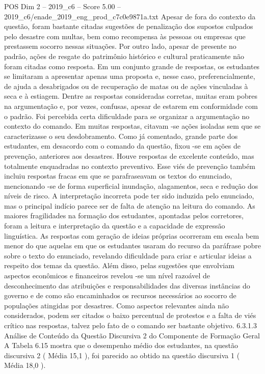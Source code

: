 \begin{textsample}{POS Dim 2 – 2019\_c6 – Score 5.00 – 2019\_c6/enade\_2019\_eng\_prod\_c7c0e9871a.txt}
Apesar de fora do contexto da questão, foram bastante citadas sugestões de penalização dos supostos culpados pelo desastre com multas, bem como recompensa às pessoas ou empresas que prestassem socorro nessas situações.
Por outro lado, apesar de presente no padrão, ações de resgate do patrimônio histórico e cultural praticamente não foram citadas como resposta.
Em um conjunto grande de respostas, os estudantes se limitaram a apresentar apenas uma proposta e, nesse caso, preferencialmente, de ajuda a desabrigados ou de recuperação de matas ou de ações vinculadas à seca e à estiagem.
Dentre as respostas consideradas corretas, muitas eram pobres na argumentação e, por vezes, confusas, apesar de estarem em conformidade com o padrão.
Foi percebida certa dificuldade para se organizar a argumentação no contexto do comando.
Em muitas respostas, citavam -se ações isoladas sem que se caracterizasse o seu desdobramento.
Como já comentado, grande parte dos estudantes, em desacordo com o comando da questão, fixou -se em ações de prevenção, anteriores aos desastres.
Houve respostas de excelente conteúdo, mas totalmente enquadradas no contexto preventivo.
Esse viés de prevenção também incluiu respostas fracas em que se parafraseavam os textos do enunciado, mencionando -se de forma superficial inundação, alagamentos, seca e redução dos níveis de risco.
A interpretação incorreta pode ter sido induzida pelo enunciado, mas o principal indício parece ser de falta de atenção na leitura do comando.
As maiores fragilidades na formação dos estudantes, apontadas pelos corretores, foram a leitura e interpretação da questão e a capacidade de expressão linguística.
As respostas com geração de ideias próprias ocorreram em escala bem menor do que aquelas em que os estudantes usaram do recurso da paráfrase pobre sobre o texto do enunciado, revelando dificuldade para criar e articular ideias a respeito dos temas da questão.
Além disso, pelas sugestões que envolviam aspectos econômicos e financeiros revelou -se um nível razoável de desconhecimento das atribuições e responsabilidades das diversas instâncias do governo e de como são encaminhados os recursos necessários ao socorro de populações atingidas por desastres.
Como aspectos relevantes ainda não considerados, podem ser citados o baixo percentual de protestos e a falta de viés crítico nas respostas, talvez pelo fato de o comando ser bastante objetivo. 6.3.1.3 Análise de Conteúdo da Questão Discursiva 2 do Componente de Formação Geral A Tabela 6.15 mostra que o desempenho médio dos estudantes, na questão discursiva 2 ( Média 15,1 ), foi parecido ao obtido na questão discursiva 1 ( Média 18,0 ).

\end{textsample}
